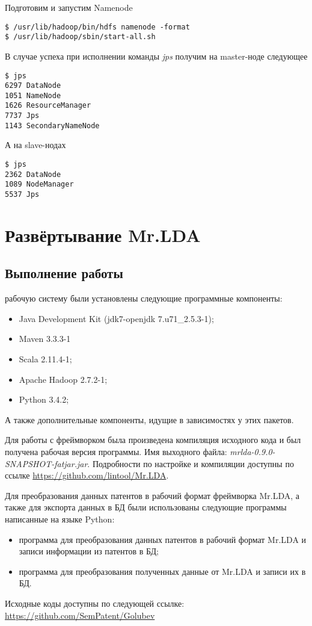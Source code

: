 Подготовим и запустим Namenode
\begin{lstlisting}
$ /usr/lib/hadoop/bin/hdfs namenode -format
$ /usr/lib/hadoop/sbin/start-all.sh
\end{lstlisting}
В случае успеха при исполнении команды \emph{jps} получим на master-ноде следующее
\begin{lstlisting}
$ jps
6297 DataNode
1051 NameNode
1626 ResourceManager
7737 Jps
1143 SecondaryNameNode
\end{lstlisting}
А на slave-нодах
\begin{lstlisting}
$ jps
2362 DataNode
1089 NodeManager
5537 Jps
\end{lstlisting}

\section{Развёртывание Mr.LDA}
\subsection{Выполнение работы}
 рабочую систему были установлены следующие программные компоненты:
\begin{itemize}
    \item Java Development Kit (jdk7-openjdk 7.u71\_2.5.3-1);
    \item Maven 3.3.3-1
    \item Scala 2.11.4-1;
    \item Apache Hadoop 2.7.2-1;
    \item Python 3.4.2;
\end{itemize}
А также дополнительные компоненты, идущие в зависимостях у этих пакетов.

Для работы с фреймворком была произведена компиляция исходного кода и был получена рабочая версия программы. 
Имя выходного файла: \emph{mrlda-0.9.0-SNAPSHOT-fatjar.jar}. Подробности по настройке и компиляции доступны 
по ссылке \url{https://github.com/lintool/Mr.LDA}.

Для преобразования данных патентов в рабочий формат фреймворка Mr.LDA, а также для экспорта данных в БД были 
использованы следующие программы написанные на языке Python:
\begin{itemize}
    \item программа для преобразования данных патентов в рабочий формат Mr.LDA и записи информации из 
        патентов в БД;
    \item программа для преобразования полученных данные от Mr.LDA и записи их в БД.
\end{itemize}
Исходные коды доступны по следующей ссылке:\\
\url{https://github.com/SemPatent/Golubev}

